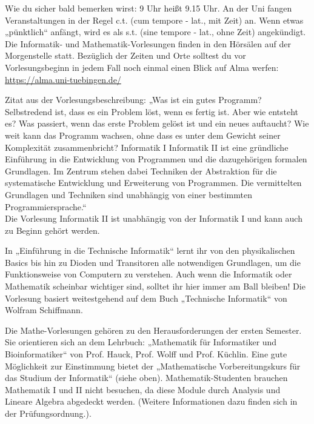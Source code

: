 
Wie du sicher bald bemerken wirst: 9 Uhr heißt 9.15 Uhr. An der Uni fangen Veranstaltungen in der Regel c.t. (cum
tempore - lat., mit Zeit) an. Wenn etwas „pünktlich“ anfängt, wird es als s.t. (sine tempore - lat., ohne
Zeit) angekündigt. Die Informatik- und Mathematik-Vorlesungen finden in den Hörsälen auf der
Morgenstelle statt. Bezüglich der Zeiten und Orte solltest du vor Vorlesungsbeginn in jedem Fall noch einmal einen Blick auf Alma werfen:\\
\url{https://alma.uni-tuebingen.de/}

\ifbachelor
{}
Zitat aus der Vorlesungsbeschreibung: „Was ist ein gutes Programm? Selbstredend ist, dass es ein
Problem löst, wenn es fertig ist. Aber wie entsteht es? Was passiert, wenn das erste Problem gelöst
ist und ein neues auftaucht? Wie weit kann das Programm wachsen, ohne dass es unter dem Gewicht
seiner Komplexität zusammenbricht? 
\ifwintersemester
Informatik I 
\fi
\ifsommersemester
Informatik II
\fi 
ist eine gründliche Einführung in die Entwicklung
von Programmen und die dazugehörigen formalen Grundlagen. Im Zentrum stehen dabei Techniken der Abstraktion
für die systematische Entwicklung und Erweiterung von Programmen. Die vermittelten Grundlagen und Techniken
sind unabhängig von einer bestimmten Programmiersprache.“\\
Die Vorlesung Informatik II ist unabhängig von der Informatik I und kann auch zu Beginn gehört werden.


\ifinfo
\ifwintersemester
{}
In „Einführung in die Technische Informatik“ lernt ihr von den physikalischen Basics bis hin zu Dioden und Transitoren alle notwendigen Grundlagen, um die Funktionsweise von Computern zu verstehen. Auch wenn die Informatik oder Mathematik scheinbar wichtiger sind, solltet ihr hier immer am Ball bleiben! Die Vorlesung basiert weitestgehend auf dem Buch „Technische Informatik“ von Wolfram Schiffmann.
\fi
\fi

Die Mathe-Vorlesungen gehören zu den Herausforderungen der ersten Semester. Sie orientieren
sich an dem Lehrbuch: „Mathematik für Informatiker und Bioinformatiker“ von Prof.
Hauck, Prof. Wolff und Prof. Küchlin. Eine gute Möglichkeit zur Einstimmung bietet der „Mathematische
Vorbereitungskurs für das Studium der Informatik“ (siehe oben).
\iflehramt
Mathematik-Studenten brauchen Mathematik I
und II nicht besuchen, da diese Module durch Analysis und Lineare Algebra
abgedeckt werden. (Weitere Informationen dazu finden sich in der
Prüfungsordnung.).
\fi
\fi
